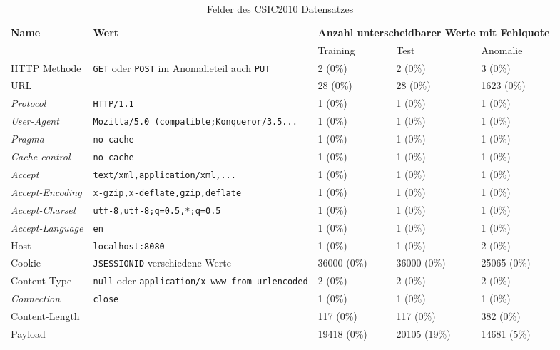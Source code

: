 \begin{sidewaystable}[h]
  \centering
  \begin{tabular}{lllll}
    \toprule
    \textbf{Name} & \textbf{Wert} & \multicolumn{3}{l}{\textbf{Anzahl unterscheidbarer Werte mit Fehlquote}} \\
     & & Training & Test & Anomalie \\
    \midrule
    HTTP Methode & \verb=GET= oder \verb=POST= im Anomalieteil auch \verb=PUT=  & 2 (0\%) & 2 (0\%) & 3 (0\%)\\
    URL  & & 28 (0\%) & 28 (0\%) & 1623 (0\%)\\
    \emph{Protocol} & \verb=HTTP/1.1= & 1 (0\%) & 1 (0\%) & 1 (0\%)\\
    \emph{User-Agent} & \verb=Mozilla/5.0 (compatible;Konqueror/3.5...= &  1 (0\%) & 1 (0\%) & 1 (0\%)\\
    \emph{Pragma} & \verb=no-cache=  & 1 (0\%) & 1 (0\%) & 1 (0\%)\\
    \emph{Cache-control} & \verb=no-cache=  & 1 (0\%) & 1 (0\%) & 1 (0\%)\\
    \emph{Accept} & \verb=text/xml,application/xml,...= & 1 (0\%) & 1 (0\%) & 1 (0\%)\\
    \emph{Accept-Encoding} & \verb=x-gzip,x-deflate,gzip,deflate= & 1 (0\%) & 1 (0\%) & 1 (0\%)\\
    \emph{Accept-Charset} & \verb!utf-8,utf-8;q=0.5,*;q=0.5! & 1 (0\%) & 1 (0\%) & 1 (0\%)\\
    \emph{Accept-Language} & \verb=en= & 1 (0\%) & 1 (0\%) & 1 (0\%)\\
    Host & \verb=localhost:8080= & 1 (0\%) & 1 (0\%) & 2 (0\%)\\
    Cookie & \verb=JSESSIONID= verschiedene Werte  & 36000 (0\%) & 36000 (0\%) & 25065 (0\%) \\
    Content-Type & \verb=null= oder \verb=application/x-www-from-urlencoded= & 2 (0\%) & 2 (0\%) & 2 (0\%)\\
    \emph{Connection} & \verb=close= & 1 (0\%) & 1 (0\%) & 1 (0\%)\\
    Content-Length & & 117 (0\%) & 117 (0\%) & 382 (0\%)\\
    Payload & & 19418 (0\%) & 20105 (19\%) & 14681 (5\%)\\
    \bottomrule
    \end{tabular}
  \caption{Felder des CSIC2010 Datensatzes}
  \label{tab:csicfields}
\end{sidewaystable}

